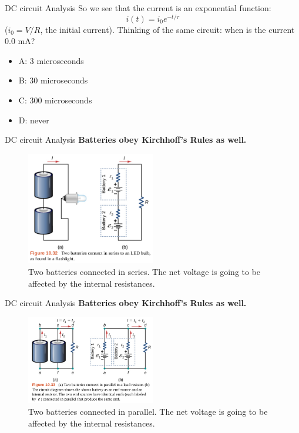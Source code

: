\documentclass{beamer}
\begin{document}
\begin{frame}{DC circuit Analysis}
So we see that the current is an exponential function:
\begin{equation}
i(t) = i_0 e^{-t/\tau}
\end{equation}
($i_0 = V/R$, the initial current).  Thinking of the same circuit: when is the current 0.0 mA?
\begin{itemize}
\item A: 3 microseconds
\item B: 30 microseconds
\item C: 300 microseconds
\item D: never
\end{itemize}
\end{frame}

\begin{frame}{DC circuit Analysis}
\textbf{Batteries obey Kirchhoff's Rules as well.}
\begin{figure}
\centering
\includegraphics[width=0.5\textwidth]{figures/batt9.png}
\caption{\label{fig:batt9} Two batteries connected in series.  The net voltage is going to be affected by the internal resistances.}
\end{figure}
\end{frame}

\begin{frame}{DC circuit Analysis}
\textbf{Batteries obey Kirchhoff's Rules as well.}
\begin{figure}
\centering
\includegraphics[width=0.5\textwidth]{figures/batt10.png}
\caption{\label{fig:batt10} Two batteries connected in parallel.  The net voltage is going to be affected by the internal resistances.}
\end{figure}
\end{frame}
\end{document}
